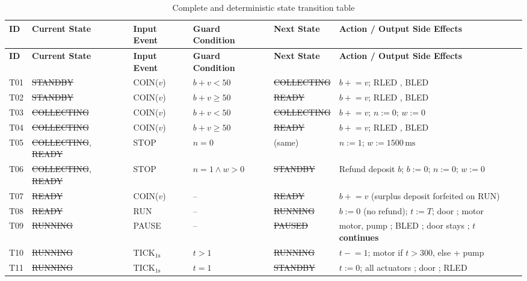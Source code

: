 \begingroup
\small
\setlength{\tabcolsep}{3pt}
\begin{longtable}{L{0.8cm}L{2.7cm}L{1.9cm}L{2.5cm}L{2.3cm}L{4.1cm}}
  \caption{Complete and deterministic state transition table}\label{tab:transitions}\\
  \toprule
  \textbf{ID} & \textbf{Current State} & \textbf{Input Event} & \textbf{Guard Condition} & \textbf{Next State} & \textbf{Action / Output Side Effects} \\
  \midrule
  \endfirsthead
  \toprule
  \textbf{ID} & \textbf{Current State} & \textbf{Input Event} & \textbf{Guard Condition} & \textbf{Next State} & \textbf{Action / Output Side Effects} \\
  \midrule
  \endhead
  \bottomrule
  \endfoot
  T01 & \st{STANDBY}    & COIN($v$) & $b+v < 50$ & \st{COLLECTING} & $b \mathrel{+}= v$; RLED , BLED  \\
  T02 & \st{STANDBY}    & COIN($v$) & $b+v \ge 50$ & \st{READY}      & $b \mathrel{+}= v$; RLED , BLED  \\
  T03 & \st{COLLECTING} & COIN($v$) & $b+v < 50$ & \st{COLLECTING} & $b \mathrel{+}= v$; $n := 0$; $w := 0$ \\
  T04 & \st{COLLECTING} & COIN($v$) & $b+v \ge 50$ & \st{READY}      & $b \mathrel{+}= v$; RLED , BLED  \\
  T05 & \st{COLLECTING}, \st{READY} & STOP & $n = 0$ & (same) & $n := 1$; $w := 1500\,\text{ms}$ \\
  T06 & \st{COLLECTING}, \st{READY} & STOP & $n = 1 \land w > 0$ & \st{STANDBY} & Refund deposit $b$; $b := 0$; $n := 0$; $w := 0$ \\
  T07 & \st{READY}      & COIN($v$) & -- & \st{READY}      & $b \mathrel{+}= v$ (surplus deposit forfeited on RUN) \\
  T08 & \st{READY}      & RUN       & -- & \st{RUNNING}    & $b := 0$ (no refund); $t := T$; door ; motor  \\
  T09 & \st{RUNNING}    & PAUSE     & -- & \st{PAUSED}     & motor, pump ; BLED ; door stays ; \textbf{$t$ continues} \\
  T10 & \st{RUNNING}    & TICK$_{1\text{s}}$ & $t > 1$ & \st{RUNNING} & $t \mathrel{-}= 1$; motor  if $t > 300$, else  + pump \\
  T11 & \st{RUNNING}    & TICK$_{1\text{s}}$ & $t = 1$ & \st{STANDBY} & $t := 0$; all actuators ; door ; RLED  \\

\end{longtable}
